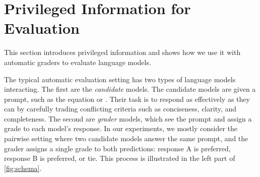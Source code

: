 \section{Privileged Information for Evaluation}\label{sec:method}



This section introduces privileged information and shows how we use it with automatic graders to evaluate language models.

The typical automatic evaluation setting has two types of language models interacting.
The first are the \emph{candidate} models.
The candidate models are given a prompt, such as the equation  or .
Their task is to respond as effectively as they can by carefully trading conflicting criteria such as conciseness, clarity, and completeness.
The second are \emph{grader} models, which see the prompt and assign a grade to each model's response.
In our experiments, we mostly consider the pairwise setting where two candidate models answer the same prompt, and the grader assigns a single grade to both predictions: response A is preferred, response B is preferred, or tie.
This process is illustrated in the left part of \cref{fig:schema}.

